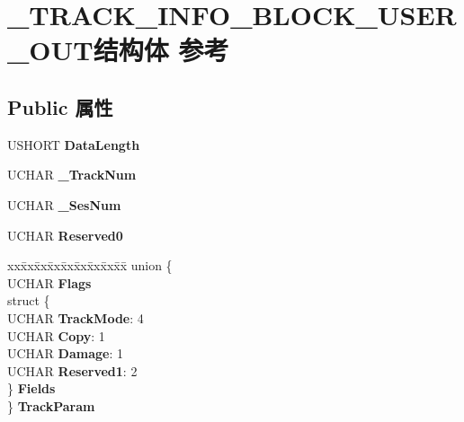 \hypertarget{struct___t_r_a_c_k___i_n_f_o___b_l_o_c_k___u_s_e_r___o_u_t}{}\section{\+\_\+\+T\+R\+A\+C\+K\+\_\+\+I\+N\+F\+O\+\_\+\+B\+L\+O\+C\+K\+\_\+\+U\+S\+E\+R\+\_\+\+O\+U\+T结构体 参考}
\label{struct___t_r_a_c_k___i_n_f_o___b_l_o_c_k___u_s_e_r___o_u_t}
\subsection*{Public 属性}
\begin{DoxyCompactItemize}
\item 
\mbox{\label{struct___t_r_a_c_k___i_n_f_o___b_l_o_c_k___u_s_e_r___o_u_t_a8ef7f204b121e4777c1ef6a48953150b}} 
U\+S\+H\+O\+RT {\bfseries Data\+Length}
\item 
\mbox{\label{struct___t_r_a_c_k___i_n_f_o___b_l_o_c_k___u_s_e_r___o_u_t_ac4f1b8a0380b87aa506d9c70f5c4d476}} 
U\+C\+H\+AR {\bfseries \+\_\+\+Track\+Num}
\item 
\mbox{\label{struct___t_r_a_c_k___i_n_f_o___b_l_o_c_k___u_s_e_r___o_u_t_aa67ed07b8c2fdb09127316225111d67b}} 
U\+C\+H\+AR {\bfseries \+\_\+\+Ses\+Num}
\item 
\mbox{\label{struct___t_r_a_c_k___i_n_f_o___b_l_o_c_k___u_s_e_r___o_u_t_a73da7ab909b2d81e80a01baf96f927e3}} 
U\+C\+H\+AR {\bfseries Reserved0}
\item 
\mbox{\label{struct___t_r_a_c_k___i_n_f_o___b_l_o_c_k___u_s_e_r___o_u_t_a97c224771c69944708e7f449f3f53704}} 
\begin{tabbing}
xx\=xx\=xx\=xx\=xx\=xx\=xx\=xx\=xx\=\kill
union \{\\
\>UCHAR {\bfseries Flags}\\
\>struct \{\\
\>\>UCHAR {\bfseries TrackMode}: 4\\
\>\>UCHAR {\bfseries Copy}: 1\\
\>\>UCHAR {\bfseries Damage}: 1\\
\>\>UCHAR {\bfseries Reserved1}: 2\\
\>\} {\bfseries Fields}\\
\} {\bfseries TrackParam}\\


\end{tabbing}
\end{DoxyCompactItemize}
